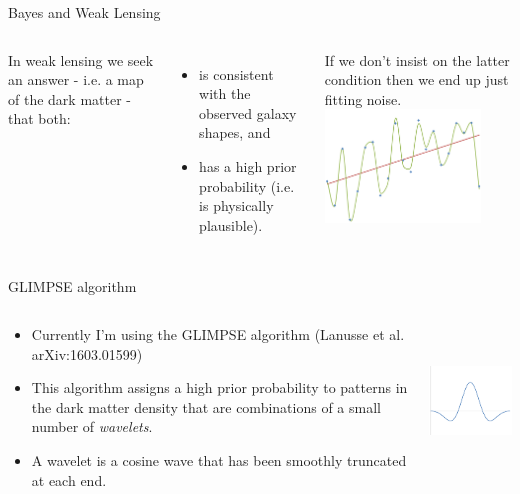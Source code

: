 \documentclass[usenames,dvipsnames]{beamer}
\begin{document}
\begin{frame}{Bayes and Weak Lensing}
  \begin{columns}
    In weak lensing we seek an answer - i.e. a map of the dark matter - that both:
      \begin{itemize}
        \item{is consistent with the observed galaxy shapes, and}
        \item{has a high prior probability (i.e. is physically plausible).}
      \end{itemize}
    If we don't insist on the latter condition then we end up just fitting noise.
    \centering
    \includegraphics[height=3cm]{diagram_5.png}
  \end{columns}
\end{frame}

\begin{frame}{GLIMPSE algorithm}
  \begin{columns}
    \begin{block}{}
      \begin{itemize}
        \item{Currently I'm using the GLIMPSE algorithm (Lanusse et al. arXiv:1603.01599)}
        \item{This algorithm assigns a high prior probability to patterns in the dark matter density that are combinations of a small number of \textit{wavelets}.}
        \item{A wavelet is a cosine wave that has been smoothly truncated at each end.}
      \end{itemize}
    \end{block}
    \centering
    \includegraphics[height=4cm]{diagram_6.png}
  \end{columns}
\end{frame}





 
\end{document}
